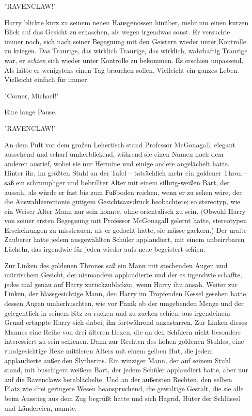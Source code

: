 {"RAVENCLAW!"

Harry blickte kurz zu seinem neuen Hausgenossen hinüber, mehr um einen kurzen Blick auf das Gesicht zu erhaschen, als wegen irgendwas sonst. Er versuchte immer noch, sich nach seiner Begegnung mit den Geistern wieder unter Kontrolle zu kriegen. Das Traurige, das wirklich Traurige, das wirklich, wahrhaftig Traurige war, er \emph{schien} sich wieder unter Kontrolle zu bekommen. Es erschien unpassend. Als hätte er wenigstens einen Tag brauchen sollen. Vielleicht ein ganzes Leben. Vielleicht einfach für immer.

"Corner, Michael!"

Eine lange Pause.

"RAVENCLAW!"

An dem Pult vor dem großen Lehertisch stand Professor McGonagall, elegant aussehend und scharf umherblickend, während sie einen Namen nach dem anderen ausrief, wobei sie nur Hermine und einige andere angelächelt hatte. Hinter ihr, im größten Stuhl an der Tafel -- tatsächlich mehr ein goldener Thron -- saß ein schrumpliger und bebrillter Alter mit einem silbrig-weißen Bart, der aussah, als würde er fast bis zum Fußboden reichen, wenn er zu sehen wäre, der die Auswahlzeremonie gütigem Gesichtsausdruck beobachtete; so stereotyp, wie ein Weiser Alter Mann nur sein konnte, ohne orientalisch zu sein. (Obwohl Harry von seiner ersten Begegnung mit Professor McGonagall gelernt hatte, stereotypen Erscheinungen zu misstrauen, als er gedacht hatte, sie müsse gackern.) Der uralte Zauberer hatte jedem ausgewählten Schüler applaudiert, mit einem unbeirrbaren Lächeln, das irgendwie für jeden wieder aufs neue begeistert schien.

Zur Linken des goldenen Thrones saß ein Mann mit stechenden Augen und mürrischem Gesicht, der niemandem applaudierte und der es irgendwie schaffte, jedes mal genau auf Harry zurückzublicken, wenn Harry ihn ansah. Weiter zur Linken, der blassgesichtige Mann, den Harry im Tropfenden Kessel gesehen hatte, dessen Augen umherhuschten, wie vor Panik ob der umgebenden Menge und der gelegentlich in seinem Sitz zu rucken und zu zucken schien; aus irgendeinem Grund ertappte Harry sich dabei, ihn fortwährend anzustarren. Zur Linken dieses Mannes eine Reihe von drei älteren Hexen, die an den Schülern nicht besonders interessiert zu sein schienen. Dann zur Rechten des hohen goldenen Stuhles, eine rundgesichtige Hexe mittleren Alters mit einem gelben Hut, die jedem applaudierte außer den Slytherins. Ein winziger Mann, der auf seinem Stuhl stand, mit buschigem weißem Bart, der jedem Schüler applaudiert hatte, aber nur auf die Ravenclaws herablächelte. Und an der äußersten Rechten, den selben Platz wie drei geringere Wesen beanspruchend, die gewaltige Gestalt, die sie alle beim Ausstieg aus dem Zug begrüßt hatte und sich Hagrid, Hüter der Schlüssel und Ländereien, nannte.

}

